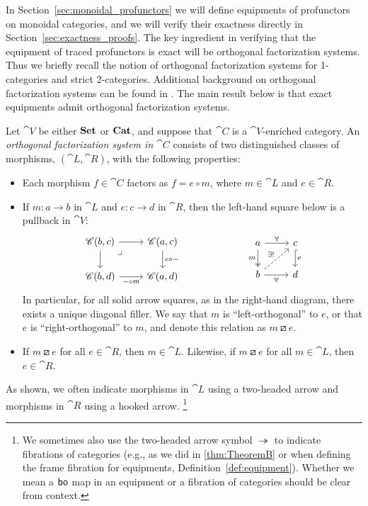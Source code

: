\documentclass[11pt,oneside,article]{memoir}
\begin{document}
In Section~\ref{sec:monoidal_profunctors} we will define equipments of profunctors on monoidal
categories, and we will verify their exactness directly in Section~\ref{sec:exactness_proofs}. The key
ingredient in verifying that the equipment of traced profunctors is exact will be orthogonal
factorization systems. Thus we briefly recall the notion of orthogonal factorization systems for
1-categories and strict 2-categories. Additional background on orthogonal factorization systems can
be found in \cite[Chapter 5.5]{BorceuxV1}. The main result below is that exact equipments admit
orthogonal factorization systems.

\begin{definition}
    \label{def:orthogonal}
  Let $\cat{V}$ be either $\mathbf{Set}$ or $\mathbf{Cat}$, and suppose that $\cat{C}$ is a $\cat{V}$-enriched
  category. An \emph{orthogonal factorization system in $\cat{C}$} consists of two distinguished
  classes of morphisms, $(\cat{L},\cat{R})$, with the following properties:
  \begin{itemize}
    \item Each morphism $f\in\cat{C}$ factors as $f=e\circ m$, where $m\in\cat{L}$ and
      $e\in\cat{R}$.
    \item If $m\colon a\to b$ in $\cat{L}$ and $e\colon c\to d$ in $\cat{R}$, then the left-hand
      square below is a pullback in $\cat{V}$:
      \begin{equation}
          \label{eqn:OrthFactSys}
        \begin{tikzcd}
          \cat{C}(b,c)\ar[r]\ar[d]\ar[rd,phantom,"\lrcorner" very near start]&\cat{C}(a,c)\ar[d,"e\circ -"]\\
          \cat{C}(b,d)\ar[r,"-\circ m"']&\cat{C}(a,d)
        \end{tikzcd}
        \hspace{.9in}
        \begin{tikzcd}
          a\ar[r,"\forall"]\ar[d,two heads,"m"']&c\ar[d,hook, "e"]\\
          b\ar[r,"\forall"']\ar[ur,dashed,"\exists!"]&d
        \end{tikzcd}
      \end{equation}
      In particular, for all solid arrow squares, as in the right-hand diagram, there exists a
      unique diagonal filler. We say that $m$ is ``left-orthogonal'' to $e$, or that $e$ is
      ``right-orthogonal'' to $m$, and denote this relation as $m\boxslash e$.
    \item If $m\boxslash e$ for all $e\in\cat{R}$, then $m\in\cat{L}$. Likewise, if $m\boxslash e$
      for all $m\in\cat{L}$, then $e\in\cat{R}$.
  \end{itemize}
  As shown, we often indicate morphisms in $\cat{L}$ using a two-headed arrow and morphisms in
  $\cat{R}$ using a hooked arrow.%
  \footnote{
    We sometimes also use the two-headed arrow symbol $\twoheadrightarrow$
    to indicate fibrations of categories (e.g., as we did in \ref{thm:TheoremB} or
    when defining the frame fibration for equipments, Definition~\ref{def:equipment}). Whether
    we mean a $\mathsf{bo}$ map in an equipment or a fibration of categories should be clear from context.
  }
\end{definition}
\end{document}

